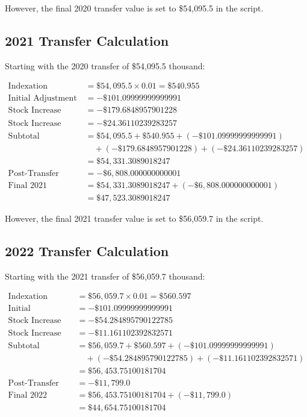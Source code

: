 \documentclass{article}
\begin{document}
However, the final 2020 transfer value is set to \$54,095.5 in the script.

\subsection{2021 Transfer Calculation}

Starting with the 2020 transfer of \$54,095.5 thousand:

\begin{align}
\text{Indexation} &= \$54,095.5 \times 0.01 = \$540.955\\
\text{Initial Adjustment} &= -\$101.09999999999991\\
\text{Stock Increase (Local)} &= -\$179.6848957901228\\
\text{Stock Increase (Delegated)} &= -\$24.36110239283257\\
\text{Subtotal} &= \$54,095.5 + \$540.955 + (-\$101.09999999999991)\\
&\quad + (-\$179.6848957901228) + (-\$24.36110239283257)\\
&= \$54,331.3089018247\\
\text{Post-Transfer Adjustment} &= -\$6,808.000000000001\\
\text{Final 2021 Transfer} &= \$54,331.3089018247 + (-\$6,808.000000000001)\\
&= \$47,523.3089018247
\end{align}

However, the final 2021 transfer value is set to \$56,059.7 in the script.

\subsection{2022 Transfer Calculation}

Starting with the 2021 transfer of \$56,059.7 thousand:

\begin{align}
\text{Indexation} &= \$56,059.7 \times 0.01 = \$560.597\\
\text{Initial Adjustment} &= -\$101.09999999999991\\
\text{Stock Increase (Local)} &= -\$54.284895790122785\\
\text{Stock Increase (Delegated)} &= -\$11.161102392832571\\
\text{Subtotal} &= \$56,059.7 + \$560.597 + (-\$101.09999999999991)\\
&\quad + (-\$54.284895790122785) + (-\$11.161102392832571)\\
&= \$56,453.75100181704\\
\text{Post-Transfer Adjustment} &= -\$11,799.0\\
\text{Final 2022 Transfer} &= \$56,453.75100181704 + (-\$11,799.0)\\
&= \$44,654.75100181704
\end{align}
\end{document}
